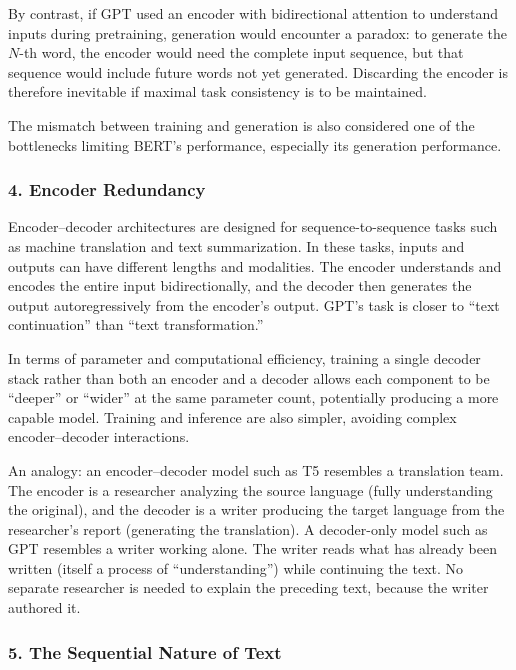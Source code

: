 By contrast, if GPT used an encoder with bidirectional attention to understand inputs during pretraining, generation would encounter a paradox: to generate the \(N\)-th word, the encoder would need the complete input sequence, but that sequence would include future words not yet generated. Discarding the encoder is therefore inevitable if maximal task consistency is to be maintained.

The mismatch between training and generation is also considered one of the bottlenecks limiting BERT's performance, especially its generation performance.

\hypertarget{encoder-redundancy}{%
\subsubsection{4. Encoder Redundancy}\label{encoder-redundancy}}

Encoder--decoder architectures are designed for sequence-to-sequence tasks such as machine translation and text summarization. In these tasks, inputs and outputs can have different lengths and modalities. The encoder understands and encodes the entire input bidirectionally, and the decoder then generates the output autoregressively from the encoder's output. GPT's task is closer to ``text continuation'' than ``text transformation.''

In terms of parameter and computational efficiency, training a single decoder stack rather than both an encoder and a decoder allows each component to be ``deeper'' or ``wider'' at the same parameter count, potentially producing a more capable model. Training and inference are also simpler, avoiding complex encoder--decoder interactions.

An analogy: an encoder--decoder model such as T5 resembles a translation team. The encoder is a researcher analyzing the source language (fully understanding the original), and the decoder is a writer producing the target language from the researcher's report (generating the translation). A decoder-only model such as GPT resembles a writer working alone. The writer reads what has already been written (itself a process of ``understanding'') while continuing the text. No separate researcher is needed to explain the preceding text, because the writer authored it.

\hypertarget{the-sequential-nature-of-text}{%
\subsubsection{5. The Sequential Nature of Text}\label{the-sequential-nature-of-text}}

